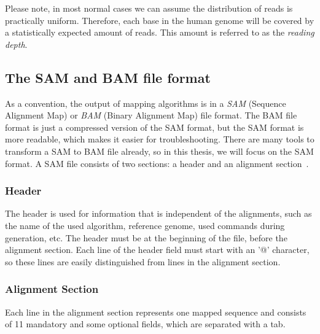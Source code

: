Please note, in most normal cases we can assume the distribution of reads is practically uniform. Therefore, each base in the human genome will be covered by a statistically expected amount of reads. This amount is referred to as the \emph{reading depth}.


\subsection{The SAM and BAM file format}
\label{expl:SAM}

As a convention, the output of mapping algorithms is in a \emph{SAM} (Sequence Alignment Map) or \emph{BAM} (Binary Alignment Map) file format. The BAM file format is just a compressed version of the SAM format, but the SAM format is more readable, which makes it easier for troubleshooting. There are many tools to transform a SAM to BAM file already, so in this thesis, we will focus on the SAM format. A SAM file consists of two sections: a header and an alignment section~\cite{SAM}.


\subsubsection{Header}
The header is used for information that is independent of the alignments, such as the name of the used algorithm, reference genome, used commands during generation, etc.
The header must be at the beginning of the file, before the alignment section. Each line of the header field must start with an '@' character, so these lines are easily distinguished from lines in the alignment section.

\subsubsection{Alignment Section}
Each line in the alignment section represents one mapped sequence and consists of 11 mandatory and some optional fields, which are separated with a tab.

